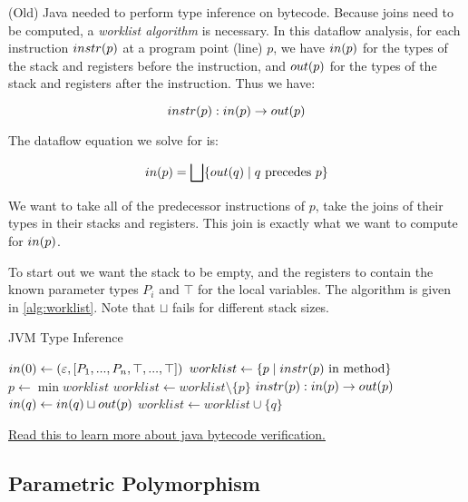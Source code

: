 \documentclass{article}
\begin{document}
(Old) Java needed to perform type inference on bytecode. Because joins need to be computed, a \textit{worklist algorithm} is necessary.
In this dataflow analysis, for each instruction $instr{}(p)$ at a program point (line) $p$, we have $in(p)$ for the types of the stack and registers before the instruction, and $out(p)$ for the types of the stack and registers after the instruction.
Thus we have:

\begin{equation}
instr{}(p) : in(p) \rightarrow out(p)
\end{equation}

The dataflow equation we solve for is:

\begin{equation}
in(p) = \bigsqcup \{ out(q) \mid q ~ \text{precedes} ~ p \}
\end{equation}

We want to take all of the predecessor instructions of $p$, take the joins of their types in their stacks and registers.
This join is exactly what we want to compute for $in(p)$.

To start out we want the stack to be empty, and the registers to contain the known parameter types $P_i$ and $\top$ for the local variables. The algorithm is given in \ref{alg:worklist}. Note that $\sqcup$ fails for different stack sizes.

\begin{algorithm}
\caption{JVM Type Inference}\label{alg:worklist}
\begin{algorithmic}
\State $in(0) \gets (\varepsilon, [P_1, ..., P_n, \top, ..., \top])$
\State $worklist \gets \{ p \mid instr{}(p) ~ \text{in method} \}$
\State $p \gets \min{worklist}$
\State $worklist \gets worklist \setminus \{ p \}$
\State $instr{}(p) : in(p) \rightarrow out(p)$
    \State $in(q) \gets in(q) \sqcup out(p)$
        \State $worklist \gets worklist \cup \{ q \}$
    \EndIf
\EndFor
\EndWhile
\end{algorithmic}
\end{algorithm}

\href{https://www.irisa.fr/celtique/teaching/SOS/2021/Leroy-bytecode-verification-JAR.pdf}{Read this to learn more about java bytecode verification.}

\subsection{Parametric Polymorphism}
\end{document}

